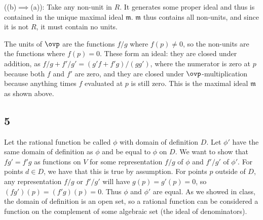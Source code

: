 \documentclass{article}
\begin{document}
\noindent ((b)$\implies$(a)): Take any non-unit in $R$. It generates some proper ideal and thus is contained in the unique maximal ideal $\mathfrak{m}$. $\mathfrak{m}$ thus contains all non-units, and since it is not $R$, it must contain no units.

The units of $\ovp$ are the functions $f/g$ where $f(p)\neq0$, so the non-units are the functions where $f(p)=0$. These form an ideal: they are closed under addition, as $f/g+f'/g'=(g'f+f'g)/(gg')$, where the numerator is zero at $p$ because both $f$ and $f'$ are zero, and they are closed under $\ovp$-multiplication because anything times $f$ evaluated at $p$ is still zero. This is the maximal ideal $\mathfrak{m}$ as shown above.
\subsection*{5}
Let the rational function be called $\phi$ with domain of definition $D$. Let $\phi'$ have the same domain of definition as $\phi$ and be equal to $\phi$ on $D$. We want to show that $fg'=f'g$ as functions on $V$ for some representation $f/g$ of $\phi$ and $f'/g'$ of $\phi'$. For points $d\in D$, we have that this is true by assumption. For points $p$ outside of $D$, any representation $f/g$ or $f'/g'$ will have $g(p)=g'(p)=0$, so $(fg')(p)=(f'g)(p)=0$. Thus $\phi$ and $\phi'$ are equal. As we showed in class, the domain of definition is an open set, so a rational function can be considered a function on the complement of some algebraic set (the ideal of denominators).
\end{document}
